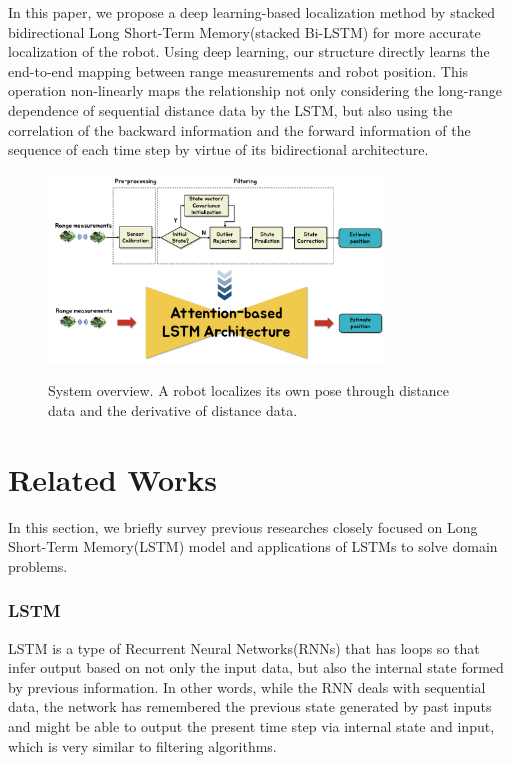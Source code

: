 \documentclass[letterpaper, 10 pt, conference]{ieeeconf}  %
\begin{document}
 In this paper, we propose a deep learning-based localization method by stacked bidirectional Long Short-Term Memory(stacked Bi-LSTM) for more accurate localization of the robot. Using deep learning, our structure directly learns the end-to-end mapping between range measurements and robot position. This operation non-linearly maps the relationship not only considering the long-range dependence of sequential distance data by the LSTM, but also using the correlation of the backward information and the forward information of the sequence of each time step by virtue of its bidirectional architecture.
 
\begin{figure}[h]
	
	\centering
	\includegraphics[height=5cm]{CE554_traditional_to_RNN}
	\label{fig:example}
	\caption{System overview. A robot localizes its own pose through distance data and the derivative of distance data. }
	
\end{figure}

\section{Related Works}

In this section, we briefly survey previous researches closely focused on 
Long Short-Term Memory(LSTM) model and applications of LSTMs to solve domain problems.

\subsubsection{LSTM}

LSTM is a type of Recurrent Neural Networks(RNNs) that has loops so that infer output based on not only the input data, but also the internal state formed by previous information. In other words, while the RNN deals with sequential data, the network has remembered the previous state generated by past inputs and might be able to output the present time step via internal state and input, which is very similar to filtering algorithms.
\end{document}
